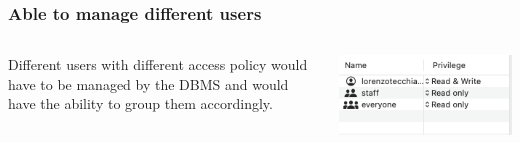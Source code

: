\documentclass{beamer}
\begin{document}
\begin{frame}
	\frametitle{Able to manage different users}
	\begin{columns}
	\begin{column}{0.4\textwidth}
		Different users with different access policy would have to be managed by the DBMS and would have the ability to group them accordingly.

	\end{column}
	\begin{column}{0.4\textwidth}
		\includegraphics[width=\columnwidth]{rootaccess.png}

	\end{column}
	\end{columns}
\end{frame}
\end{document}
